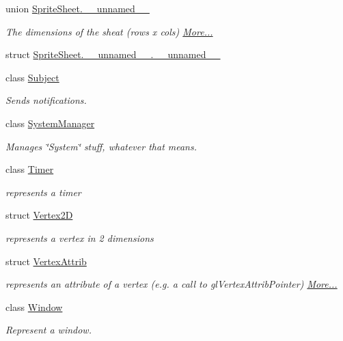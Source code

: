 \begin{DoxyCompactItemize}
union \hyperlink{namespacenta_d1/d70/unionnta_1_1SpriteSheet_8____unnamed____}{Sprite\+Sheet.\+\_\+\+\_\+unnamed\+\_\+\+\_\+}
\begin{DoxyCompactList}\small\item\em The dimensions of the sheat (rows x cols)  \hyperlink{namespacenta_d1/d70/unionnta_1_1SpriteSheet_8____unnamed____}{More...}\end{DoxyCompactList}\item 
struct \hyperlink{namespacenta_df/d10/structnta_1_1SpriteSheet_8____unnamed_____8____unnamed____}{Sprite\+Sheet.\+\_\+\+\_\+unnamed\+\_\+\+\_\+.\+\_\+\+\_\+unnamed\+\_\+\+\_\+}
\item 
class \hyperlink{classnta_1_1Subject}{Subject}
\begin{DoxyCompactList}\small\item\em Sends notifications. \end{DoxyCompactList}\item 
class \hyperlink{classnta_1_1SystemManager}{System\+Manager}
\begin{DoxyCompactList}\small\item\em Manages \char`\"{}\+System\char`\"{} stuff, whatever that means. \end{DoxyCompactList}\item 
class \hyperlink{classnta_1_1Timer}{Timer}
\begin{DoxyCompactList}\small\item\em represents a timer \end{DoxyCompactList}\item 
struct \hyperlink{structnta_1_1Vertex2D}{Vertex2D}
\begin{DoxyCompactList}\small\item\em represents a vertex in 2 dimensions \end{DoxyCompactList}\item 
struct \hyperlink{namespacenta_df/d9d/structnta_1_1VertexAttrib}{Vertex\+Attrib}
\begin{DoxyCompactList}\small\item\em represents an attribute of a vertex (e.\+g. a call to gl\+Vertex\+Attrib\+Pointer)  \hyperlink{namespacenta_df/d9d/structnta_1_1VertexAttrib}{More...}\end{DoxyCompactList}\item 
class \hyperlink{classnta_1_1Window}{Window}
\begin{DoxyCompactList}\small\item\em Represent a window. \end{DoxyCompactList}\end{DoxyCompactItemize}
